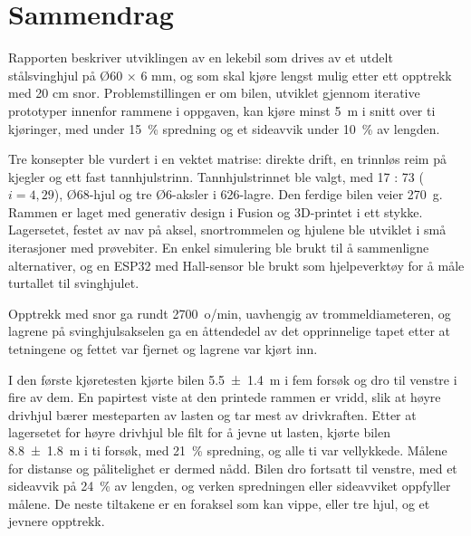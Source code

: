 \section*{Sammendrag}
Rapporten beskriver utviklingen av en lekebil som drives av et utdelt stålsvinghjul på Ø60 × 6 mm, og som skal kjøre lengst mulig etter ett opptrekk med 20 cm snor. Problemstillingen er om bilen, utviklet gjennom iterative prototyper innenfor rammene i oppgaven, kan kjøre minst \SI{5}{m} i snitt over ti kjøringer, med under \SI{15}{\percent} spredning og et sideavvik under \SI{10}{\percent} av lengden.

Tre konsepter ble vurdert i en vektet matrise: direkte drift, en trinnløs reim på kjegler og ett fast tannhjulstrinn. Tannhjulstrinnet ble valgt, med 17 : 73 ($i = 4{,}29$), Ø68-hjul og tre Ø6-aksler i 626-lagre. Den ferdige bilen veier \SI{270}{g}. Rammen er laget med generativ design i Fusion og 3D-printet i ett stykke. Lagersetet, festet av nav på aksel, snortrommelen og hjulene ble utviklet i små iterasjoner med prøvebiter. En enkel simulering ble brukt til å sammenligne alternativer, og en ESP32 med Hall-sensor ble brukt som hjelpeverktøy for å måle turtallet til svinghjulet.

Opptrekk med snor ga rundt \SI{2700}{o/min}, uavhengig av trommeldiameteren, og lagrene på svinghjulsakselen ga en åttendedel av det opprinnelige tapet etter at tetningene og fettet var fjernet og lagrene var kjørt inn.

I den første kjøretesten kjørte bilen \SI[separate-uncertainty=true]{5,5 \pm 1,4}{m} i fem forsøk og dro til venstre i fire av dem. En papirtest viste at den printede rammen er vridd, slik at høyre drivhjul bærer mesteparten av lasten og tar mest av drivkraften. Etter at lagersetet for høyre drivhjul ble filt for å jevne ut lasten, kjørte bilen \SI[separate-uncertainty=true]{8,8 \pm 1,8}{m} i ti forsøk, med \SI{21}{\percent} spredning, og alle ti var vellykkede. Målene for distanse og pålitelighet er dermed nådd. Bilen dro fortsatt til venstre, med et sideavvik på \SI{24}{\percent} av lengden, og verken spredningen eller sideavviket oppfyller målene. De neste tiltakene er en foraksel som kan vippe, eller tre hjul, og et jevnere opptrekk.

